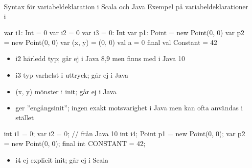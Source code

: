 \ifkompendium  %
\clearpage
\fi

\begin{Slide}{Syntax för variabeldeklaration i Scala och Java}\SlideFontSmall
Exempel på variabeldeklarationer i
\begin{multicols}{2}
\noindent{}
\begin{CodeSmall}[basicstyle=\ttfamily\SlideFontSize{7}{10},backgroundcolor=\color{white},
  frame=none]
  var i1: Int = 0
  var i2 = 0
  var i3 = 0: Int
  var p1: Point = new Point(0, 0)
  var p2 = new Point(0, 0)
  var (x, y) = (0, 0)
  val a = 0
  final val Constant = 42
\end{CodeSmall}
\begin{itemize}\SlideFontTiny
\item i2 härledd typ; går ej i Java 8,9 men finns med  i Java 10

\item i3 typ varhelst i uttryck; går ej i Java

\item (x, y) mönster i init; går ej i Java

\item {} ger ''engångsinit''; ingen exakt motsvarighet i Java men  kan ofta användas i stället
\end{itemize}

\columnbreak

\noindent{}
\begin{CodeSmall}[language=Java,morekeywords={var},basicstyle=\ttfamily\SlideFontSize{7}{10},backgroundcolor=\color{white},
  frame=none]
  int i1 = 0;
  var i2 = 0; // från Java 10
  int i4;
  Point p1 = new Point(0, 0);
  var p2 = new Point(0, 0); 
  final int CONSTANT = 42;
\end{CodeSmall}
\begin{itemize}\SlideFontTiny
\item i4 ej explicit init; går ej i Scala
\end{itemize}
\end{multicols}

\end{Slide}


